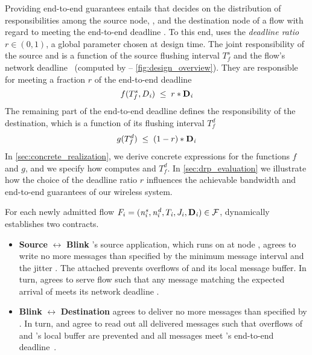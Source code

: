 Providing end-to-end guarantees entails that \DRP decides on the {distribution of responsibilities} among the source node, \blink, and the destination node of a flow \flowi with regard to meeting the end-to-end deadline \deadlinei. To this end, \DRP uses the \emph{deadline ratio}~$r \in (0,1)$, a global parameter chosen at design time.
The joint responsibility of the source and \blink is a function of the source flushing interval $T_f^s$ and the flow's network deadline \ndeadlinei~(computed by \DRP -- \cref{fig:design_overview}). They are responsible for meeting a fraction $r$ of the end-to-end deadline
\begin{equation}\label{eq:function_f}
 f(T_f^s,D_{\mathit{i}}) \; \leq \; r * \mathbf{D}_{\mathit{i}}
\end{equation}
The remaining part of the end-to-end deadline defines the responsibility of the destination, which is a function of its flushing interval $T_f^d$
\begin{equation}\label{eq:function_g}
 g(T_f^d) \; \leq \;  (1-r) * \mathbf{D}_{\mathit{i}}
\end{equation}
In \cref{sec:concrete_realization}, we derive concrete expressions for the functions $f$ and $g$, and we specify how \DRP computes \ndeadlinei and $T_f^d$.
In \cref{sec:drp_evaluation} we illustrate how the choice of the deadline ratio $r$ influences the achievable bandwidth and end-to-end guarantees of our wireless \CPs system.

For each newly admitted flow $F_{i} = (\mathit{n^s_{i}},\mathit{n^d_{i}},T_{\mathit{i}},J_{i},\mathbf{D}_{\mathit{i}}) \in \mathcal{F}$, \DRP dynamically establishes two contracts.

\begin{itemize}
	\item \textbf{Source} $\boldsymbol{\leftrightarrow}$ \textbf{Blink}
  \quad
  \flowi's source application, which runs on \apsrc at node  \flowsrci, agrees to write no more messages than specified by the minimum message interval \periodi and the jitter \jitteri. The attached \cpsrc prevents overflows of \bolt and its local message buffer.
	In turn, \blink agrees to serve flow \flowi such that any message matching the expected arrival of \flowi meets its network deadline \ndeadlinei.

	\item \textbf{Blink} $\boldsymbol{\leftrightarrow}$ \textbf{Destination}
  \quad
  \blink agrees to deliver no more messages than specified by \periodi.
	In turn, \cpdst and \apdst agree to read out all delivered messages such that overflows of \bolt and \cpdst's local  buffer are prevented and all messages meet \flowi's end-to-end deadline~\deadlinei.
\end{itemize}

